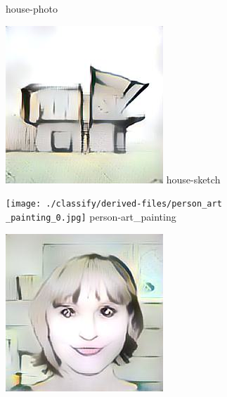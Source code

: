 \documentclass{article}
\begin{document}
\begin{figure}[htp]
\begin{minipage}{0.14285714285714285\linewidth}
        {house-photo}
    \end{minipage}%
    \begin{minipage}{0.14285714285714285\linewidth}
        \includegraphics[width=\linewidth]{./classify/derived-files/house_sketch_0.jpg}
        {house-sketch}
    \end{minipage}%
    \begin{minipage}{0.14285714285714285\linewidth}
        \texttt{[image: ./classify/derived-files/person\_art\\\_painting\_0.jpg]}
        {person-art\_painting}
    \end{minipage}%
    \begin{minipage}{0.14285714285714285\linewidth}
        \includegraphics[width=\linewidth]{./classify/derived-files/person_cartoon_0.jpg}

\end{minipage}
\end{figure}
\end{document}
